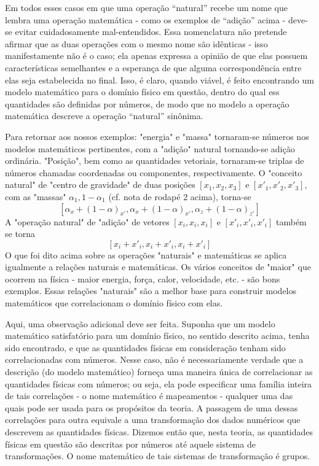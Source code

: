 \documentclass[12pt]{article}
\begin{document}
Em todos esses casos em que uma operação “natural” recebe um nome que lembra uma operação matemática - como os exemplos de “adição” acima - deve-se evitar cuidadosamente mal-entendidos. Essa nomenclatura não pretende afirmar que as duas operações com o mesmo nome são idênticas - isso manifestamente não é o caso; ela apenas expressa a opinião de que elas possuem características semelhantes e a esperança de que alguma correspondência entre elas seja estabelecida no final. Isso, é claro, quando viável, é feito encontrando um modelo matemático para o domínio físico em questão, dentro do qual ess quantidades são definidas por números, de modo que no modelo a operação matemática descreve a operação “natural” sinônima.

Para retornar aos nossos exemplos: "energia" e "massa" tornaram-se números nos modelos matemáticos pertinentes, com a "adição" natural tornando-se adição ordinária. "Posição", bem como as quantidades vetoriais, tornaram-se triplas de números chamadas coordenadas ou componentes, respectivamente. O "conceito natural" de "centro de gravidade" de duas posições \( [x_1, x_2, x_3] \) e \( [x'_1, x'_2, x'_3] \), com as "massas" \( \alpha_1, 1 - \alpha_1 \) (cf. nota de rodapé 2 acima), torna-se
\[ [ \alpha_{x} + (1 - \alpha)_{x'}, \alpha_{x} + (1 - \alpha)_{x'}, \alpha_{z} + (1 - \alpha)_{z'} ] \]
A "operação natural" de "adição" de vetores \( [x_i, x_i, x_i] \) e \( [x'_i, x'_i, x'_i] \) também se torna
\[ [x_i + x'_i, x_i + x'_i, x_i + x'_i] \]
O que foi dito acima sobre as operações "naturais" e matemáticas se aplica igualmente a relações naturais e matemáticas. Os vários conceitos de "maior" que ocorrem na física - maior energia, força, calor, velocidade, etc. - são bons exemplos.
Essas relações "naturais" são a melhor base para construir modelos matemáticos que correlacionam o domínio físico com elas. 

Aqui, uma observação adicional deve ser feita. Suponha que um modelo matemático satisfatório para um domínio físico, no sentido descrito acima, tenha sido encontrado, e que as quantidades físicas em consideração tenham sido correlacionadas com números. Nesse caso, não é necessariamente verdade que a descrição (do modelo matemático) forneça uma maneira única de correlacionar as quantidades físicas com números; ou seja, ela pode especificar uma família inteira de tais correlações - o nome matemático é mapeamentos - qualquer uma das quais pode ser usada para os propósitos da teoria. A passagem de uma dessas correlações para outra equivale a uma transformação dos dados numéricos que descrevem as quantidades físicas. Dizemos então que, nesta teoria, as quantidades físicas em questão são descritas por números até aquele sistema de transformações. O nome matemático de tais sistemas de transformação é grupos.
\end{document}
